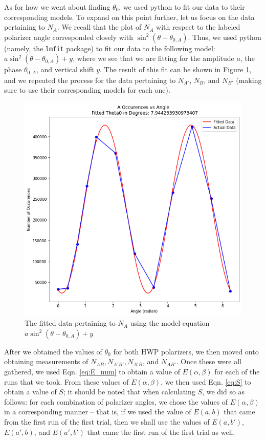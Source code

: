 \documentclass[twocolumn,amsmath,amssymb,pra]{revtex4-2}
\begin{document}
As for how we went about finding $\theta_{0}$, we used python to fit our data to their corresponding models. To expand on this point further, let us focus on the data pertaining to $N_{A}$. We recall that the plot of $N_{A}$ with respect to the labeled polarizer angle corresponded closely with $\sin^{2}(\theta - \theta_{0, A})$. Thus, we used python (namely, the \texttt{lmfit} package) to fit our data to the following model: $a \sin^{2}(\theta - \theta_{0, A}) + y$, where we see that we are fitting for the amplitude $a$, the phase $\theta_{0, A}$, and vertical shift $y$. The result of this fit can be shown in Figure \ref{fig:theta_0_fit}, and we repeated the process for the data pertaining to $N_{A'}$, $N_{B}$, and $N_{B'}$ (making sure to use their corresponding models for each one).
\begin{figure}
    \centering
    \includegraphics[width = 0.95 \linewidth]{theta_0.png}
    \caption{The fitted data pertaining to $N_{A}$ using the model equation $a \sin^{2}(\theta - \theta_{0, A}) + y$}
    \label{fig:theta_0_fit}
\end{figure}

After we obtained the values of $\theta_{0}$ for both HWP polarizers, we then moved onto obtaining measurements of $N_{AB}, N_{A'B'}, N_{A'B}$, and $N_{AB'}$. Once these were all gathered, we used Eqn. \ref{eq:E_num} to obtain a value of $E(\alpha, \beta)$ for each of the runs that we took. From these values of $E(\alpha, \beta)$, we then used Eqn. \ref{eq:S} to obtain a value of $S$; it should be noted that when calculating $S$, we did so as follows: for each combination of polarizer angles, we chose the values of $E(\alpha, \beta)$ in a corresponding manner -- that is, if we used the value of $E(a, b)$ that came from the first run of the first trial, then we shall use the values of $E(a, b')$, $E(a', b)$, and $E(a', b')$ that came the first run of the first trial as well.
\end{document}
